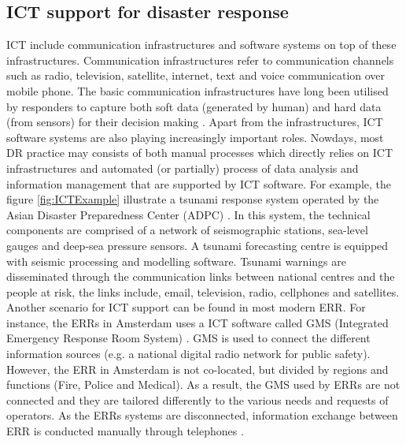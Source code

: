 \subsection{ICT support for disaster response}
\acf{ICT} include communication infrastructures and software systems on top of these infrastructures. Communication infrastructures refer to communication channels such as radio, television, satellite, internet, text and voice communication over mobile phone. The basic communication infrastructures have long been utilised by responders to capture both soft data (generated by human) and hard data (from sensors) for their decision making \citep{Fischer2012}. Apart from the infrastructures, \ac{ICT} software systems are also playing increasingly important roles. Nowdays, most DR practice may consists  of both manual processes which directly relies on \ac{ICT} infrastructures and automated (or partially) process of data analysis and information management that are supported by \ac{ICT} software. For example, the figure \ref{fig:ICTExample} illustrate a tsunami response system operated by the Asian Disaster Preparedness Center (ADPC) \citep{Wattegama2012}. In this system,  the technical components are comprised of a network of seismographic stations, sea-level gauges and deep-sea pressure sensors. A tsunami forecasting centre is equipped with seismic processing and modelling software.  Tsunami warnings are disseminated through the communication links between national centres and the people at risk, the links include, email, television, radio, cellphones and satellites. Another scenario for \ac{ICT} support can be found in most modern \acf{ERR}. For instance, the \ac{ERR}s in Amsterdam uses a \ac{ICT} software called GMS (Integrated Emergency Response Room System) \citep{Boersma2009}. GMS is used to connect the different information sources (e.g. a national digital radio network for public safety). However, the \ac{ERR} in Amsterdam is not co-located, but divided by regions and functions (Fire, Police and Medical). As a result, the GMS used by \ac{ERR}s are not connected and they are tailored differently to the various needs and requests of operators. As the \acf{ERR}s systems are disconnected, information exchange between \ac{ERR} is conducted manually through telephones \citep{Boersma2009}.\\

